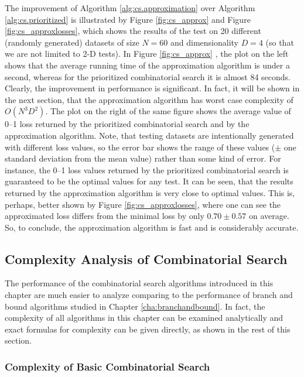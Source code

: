 The improvement of Algorithm \ref{alg:cs.approximation} over Algorithm \ref{alg:cs.prioritized} is illustrated by Figure \ref{fig:cs_approx} and Figure \ref{fig:cs_approxlosses}, which shows the results of the test on 20 different (randomly generated) datasets of size $N=60$ and dimensionality $D=4$ (so that we are not limited to 2-D tests). In Figure \ref{fig:cs_approx} , the plot on the left shows that the average running time of the approximation algorithm is under a second, whereas for the prioritized combinatorial search it is almost 84 seconds. Clearly, the improvement in performance is significant. In fact, it will be shown in the next section, that the approximation algorithm has worst case complexity of $O(N^3D^2)$. The plot on the right of the same figure shows the average value of 0--1 loss returned by the prioritized combinatorial search and by the approximation algorithm. Note, that testing datasets are intentionally generated with different loss values, so the error bar shows the range of these values ($\pm$ one standard deviation from the mean value) rather than some kind of error. For instance, the 0--1 loss values returned by the prioritized combinatorial search is guaranteed to be the optimal values for any test. It can be seen, that the results returned by the approximation algorithm is very close to optimal values. This is, perhaps, better shown by Figure \ref{fig:cs_approxlosses}, where one can see the approximated loss differs from the minimal loss by only $0.70 \pm 0.57$ on average. So, to conclude, the approximation algorithm is fast and is considerably accurate.


\subsection{Complexity Analysis of Combinatorial Search}
\label{sec:cs.performance}

The performance of the combinatorial search algorithms introduced in this chapter are much easier to analyze comparing to the performance of branch and bound algorithms studied in Chapter \ref{cha:branchandbound}. In fact, the complexity of all algorithms in this chapter can be examined analytically and exact formulas for complexity can be given directly, as shown in the rest of this section.

\subsubsection{Complexity of Basic Combinatorial Search}

